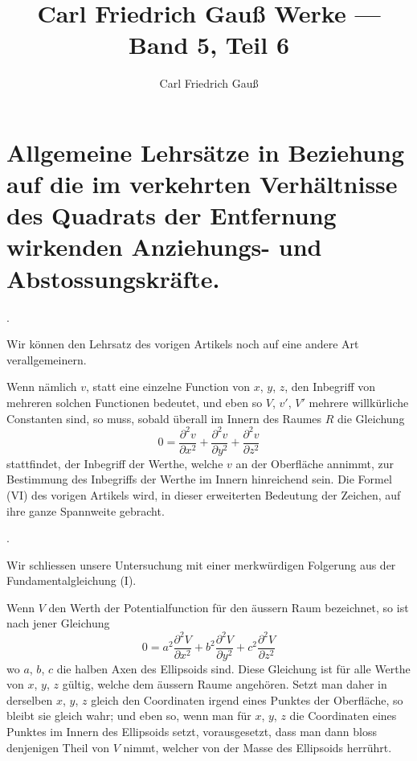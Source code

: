 \documentclass[11pt,a4paper]{article}
\title{Carl Friedrich Gauß Werke --- Band 5, Teil 6}
\author{Carl Friedrich Gauß}
\date{}
\begin{document}
\maketitle
\thispagestyle{empty}

\section*{Allgemeine Lehrsätze in Beziehung auf die im verkehrten Verhältnisse des Quadrats der Entfernung wirkenden Anziehungs- und Abstossungskräfte.}

\setcounter{section}{22}
\setcounter{equation}{0}

\bigskip{}.

\smallskip
{}%
Wir können den Lehrsatz des vorigen Artikels noch auf eine andere Art verallgemeinern.

Wenn nämlich $v$, statt eine einzelne Function von $x$, $y$, $z$, den Inbegriff von mehreren solchen Functionen bedeutet, und eben so $V$, $v'$, $V'$ mehrere willkürliche Constanten sind, so muss, sobald überall im Innern des Raumes $R$ die Gleichung
\[
0 = \frac{\partial^2 v}{\partial x^2} + \frac{\partial^2 v}{\partial y^2} + \frac{\partial^2 v}{\partial z^2}
\]
stattfindet, der Inbegriff der Werthe, welche $v$ an der Oberfläche annimmt, zur Bestimmung des Inbegriffs der Werthe im Innern hinreichend sein. Die Formel (VI) des vorigen Artikels wird, in dieser erweiterten Bedeutung der Zeichen, auf ihre ganze Spannweite gebracht.

\bigskip{}.

\smallskip
Wir schliessen unsere Untersuchung mit einer merkwürdigen Folgerung aus der Fundamentalgleichung (I).

Wenn $V$ den Werth der Potentialfunction für den äussern Raum bezeichnet, so ist nach jener Gleichung
\[
0 = a^2 \frac{\partial^2 V}{\partial x^2} + b^2 \frac{\partial^2 V}{\partial y^2} + c^2 \frac{\partial^2 V}{\partial z^2}
\]
wo $a$, $b$, $c$ die halben Axen des Ellipsoids sind. Diese Gleichung ist für alle Werthe von $x$, $y$, $z$ gültig, welche dem äussern Raume angehören. Setzt man daher in derselben $x$, $y$, $z$ gleich den Coordinaten irgend eines Punktes der Oberfläche, so bleibt sie gleich wahr; und eben so, wenn man für $x$, $y$, $z$ die Coordinaten eines Punktes im Innern des Ellipsoids setzt, vorausgesetzt, dass man dann bloss denjenigen Theil von $V$ nimmt, welcher von der Masse des Ellipsoids herrührt.
\end{document}
